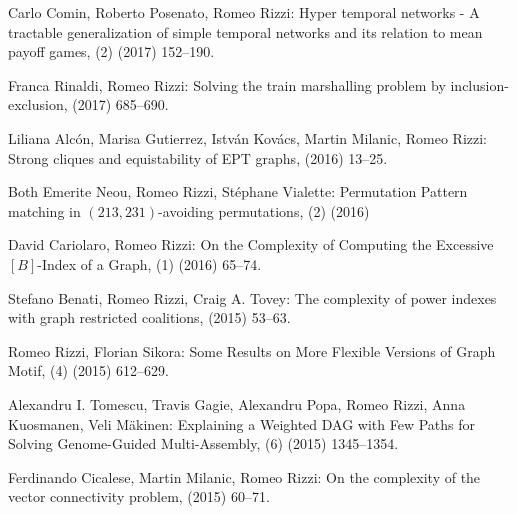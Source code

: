 \begin{etaremune}
  \item {\sc Carlo Comin, Roberto Posenato, Romeo Rizzi:}
   \newblock Hyper temporal networks - A tractable generalization of simple temporal networks and its relation to mean payoff games,
   (2) (2017) 152--190.

  \item {\sc Franca Rinaldi, Romeo Rizzi:}
   \newblock Solving the train marshalling problem by inclusion-exclusion,
    (2017) 685--690.

  \item {\sc Liliana Alcón, Marisa Gutierrez, István Kovács, Martin Milanic, Romeo Rizzi:}
   \newblock Strong cliques and equistability of EPT graphs,
    (2016) 13--25.

  \item {\sc Both Emerite Neou, Romeo Rizzi, Stéphane Vialette:}
   \newblock Permutation Pattern matching in $(213, 231)$-avoiding permutations,
   (2) (2016)
   
  \item {\sc David Cariolaro, Romeo Rizzi:}
   \newblock On the Complexity of Computing the Excessive $[B]$-Index of a Graph,
   (1) (2016) 65--74.

  \item {\sc Stefano Benati, Romeo Rizzi, Craig A. Tovey:}
   \newblock The complexity of power indexes with graph restricted coalitions,
    (2015) 53--63.

  \item {\sc Romeo Rizzi, Florian Sikora:}
   \newblock Some Results on More Flexible Versions of Graph Motif,
   (4) (2015) 612--629.

  \item {\sc Alexandru I. Tomescu, Travis Gagie, Alexandru Popa, Romeo Rizzi, Anna Kuosmanen, Veli Mäkinen:}
   \newblock Explaining a Weighted DAG with Few Paths for Solving Genome-Guided Multi-Assembly,
   (6) (2015) 1345--1354.

  \item {\sc Ferdinando Cicalese, Martin Milanic, Romeo Rizzi:}
   \newblock On the complexity of the vector connectivity problem,
    (2015) 60--71.        


\end{etaremune}
